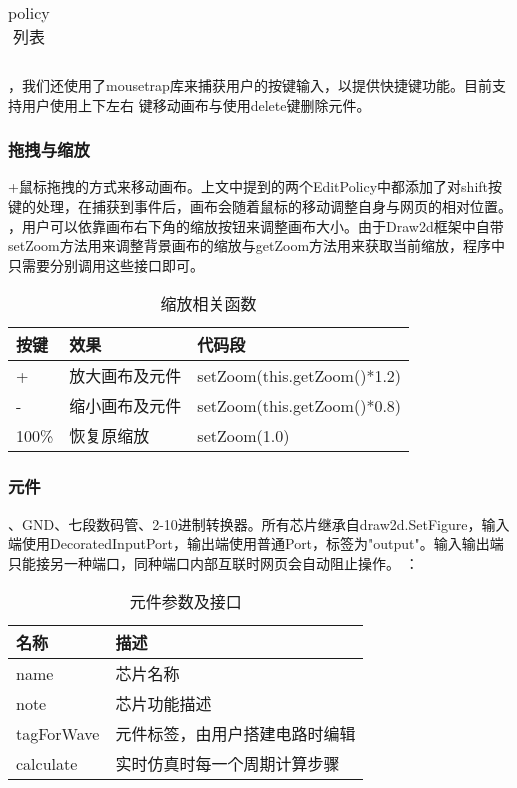 \documentclass{article}
\begin{document}
\begin{CJK}{UTF8}{gbsn}
\begin{table}[!h]
\begin{tabular}{|l|l|}
    \end{tabular}
    \caption{policy列表}
    \end{table}

    ，我们还使用了mousetrap库来捕获用户的按键输入，以提供快捷键功能。目前支持用户使用上下左右
    键移动画布与使用delete键删除元件。

\subsubsection{拖拽与缩放}
    +鼠标拖拽的方式来移动画布。上文中提到的两个EditPolicy中都添加了对shift按键的处理，在捕获到事件后，画布会随着鼠标的移动调整自身与网页的相对位置。
    ，用户可以依靠画布右下角的缩放按钮来调整画布大小。由于Draw2d框架中自带setZoom方法用来调整背景画布的缩放与getZoom方法用来获取当前缩放，程序中只需要分别调用这些接口即可。
    \begin{table}[!h]
    \begin{tabular}{|l|l|l|}
    \hline
    按键 & 效果 & 代码段 \\
    \hline
    + & 放大画布及元件 & setZoom(this.getZoom()*1.2) \\
    \hline
    - & 缩小画布及元件 & setZoom(this.getZoom()*0.8) \\
    \hline
    100\% & 恢复原缩放 & setZoom(1.0) \\
    \hline
    \end{tabular}
    \caption{缩放相关函数}
    \end{table}

\subsubsection{元件}
    、GND、七段数码管、2-10进制转换器。所有芯片继承自draw2d.SetFigure，输入端使用DecoratedInputPort，输出端使用普通Port，标签为"output"。输入输出端只能接另一种端口，同种端口内部互联时网页会自动阻止操作。
    ：
    \begin{table}[!h]
    \begin{tabular}{|l|l|}
    \hline
    名称 & 描述 \\
    \hline
    name & 芯片名称 \\
    \hline
    note & 芯片功能描述 \\
    \hline
    tagForWave & 元件标签，由用户搭建电路时编辑 \\
    \hline
    calculate & 实时仿真时每一个周期计算步骤\\
    \hline
    \end{tabular}
    \caption{元件参数及接口}
    \end{table}


\end{CJK}
\end{document}
